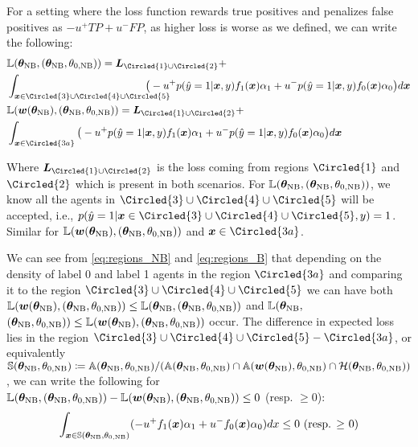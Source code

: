 For a setting where the loss function rewards true positives and penalizes false positives as $-u^+ TP + u^- FP$, as higher loss is worse as we defined, we can write the following:
\begin{align}\label{eq:regions_NB}
    &\sL(\vtheta_\text{NB}, (\vtheta_\text{NB}, \theta_{0, \text{NB}}))=\mL_{\Circled{1}\cup\Circled{2}} + \notag\\
    &\int_{\vx\in\Circled{3}\cup\Circled{4}\cup\Circled{5}} \hspace{-0.9cm} \big( -u^+ p(\hat{y}=1 | \vx, y)f_1(\vx)\alpha_1 + u^- p(\hat{y}=1 | \vx, y)f_0(\vx)\alpha_0 \big) d\vx \\
    &\sL(\vw(\vtheta_\text{NB}), (\vtheta_\text{NB}, \theta_{0, \text{NB}}))=\mL_{\Circled{1}\cup\Circled{2}} + \notag\\
    &\int_{\vx\in\Circled{3a}} \big( -u^+ p(\hat{y}=1 | \vx, y)f_1(\vx)\alpha_1 + u^- p(\hat{y}=1 | \vx, y)f_0(\vx)\alpha_0 \big ) d\vx\label{eq:regions_B}
\end{align}

Where $\mL_{\Circled{1}\cup\Circled{2}}$ is the loss coming from regions $\Circled{1}$ and $\Circled{2}$ which is present in both scenarios. For ${\mathbb{L}}({\bm{\theta}}_\text{NB}, ({\bm{\theta}}_\text{NB}, \theta_{0, \text{NB}}))$, we know all the agents in $\Circled{3}\cup\Circled{4}\cup\Circled{5}$ will be accepted, i.e., $p(\hat{y}=1 | \vx\in\Circled{3}\cup\Circled{4}\cup\Circled{5}, y)=1$. Similar for ${\mathbb{L}}({\bm{w}}({\bm{\theta}}_\text{NB}), ({\bm{\theta}}_\text{NB}, \theta_{0, \text{NB}}))$ and $\vx\in\Circled{3a}$. 

We can see from \eqref{eq:regions_NB} and \eqref{eq:regions_B} that depending on the density of label 0 and label 1 agents in the region $\Circled{3a}$ and comparing it to the region $\Circled{3}\cup\Circled{4}\cup\Circled{5}$ we can have both ${\mathbb{L}}({\bm{w}}({\bm{\theta}}_\text{NB}), ({\bm{\theta}}_\text{NB}, \theta_{0, \text{NB}}))\le {\mathbb{L}}({\bm{\theta}}_\text{NB}, ({\bm{\theta}}_\text{NB}, \theta_{0, \text{NB}}))$ and ${\mathbb{L}}({\bm{\theta}}_\text{NB},$ $({\bm{\theta}}_\text{NB}, \theta_{0, \text{NB}}))\le {\mathbb{L}}({\bm{w}}({\bm{\theta}}_\text{NB}), ({\bm{\theta}}_\text{NB}, \theta_{0, \text{NB}}))$ occur. The difference in expected loss lies in the region $\Circled{3}\cup\Circled{4}\cup\Circled{5}-\Circled{3a}$, or equivalently ${\mathbb{S}}({\bm{\theta}}_\text{NB}, \theta_{0, \text{NB}}) \coloneqq {\mathbb{A}}({\bm{\theta}}_\text{NB}, \theta_{0, \text{NB}})/({\mathbb{A}}({\bm{\theta}}_\text{NB}, \theta_{0, \text{NB}})\cap {\mathbb{A}}({\bm{w}}({\bm{\theta}}_\text{NB}), \theta_{0, \text{NB}}) \cap\mathcal{H}({\bm{\theta}}_\text{NB}, \theta_{0, \text{NB}}))$, we can write the following for ${\mathbb{L}}({\bm{\theta}}_\text{NB}, ({\bm{\theta}}_\text{NB}, \theta_{0, \text{NB}})) - {\mathbb{L}}({\bm{w}}({\bm{\theta}}_\text{NB}), ({\bm{\theta}}_\text{NB}, \theta_{0, \text{NB}}))\le 0$ (resp. $\ge 0$):
\begin{align}
    \int_{{\bm{x}}\in{\mathbb{S}}({\bm{\theta}}_\text{NB}, \theta_{0, \text{NB}})}(-u^+f_1({\bm{x}})\alpha_1+u^-f_0({\bm{x}})\alpha_0)dx \le 0 \text{ (resp. $\ge$ 0)}
\end{align}

